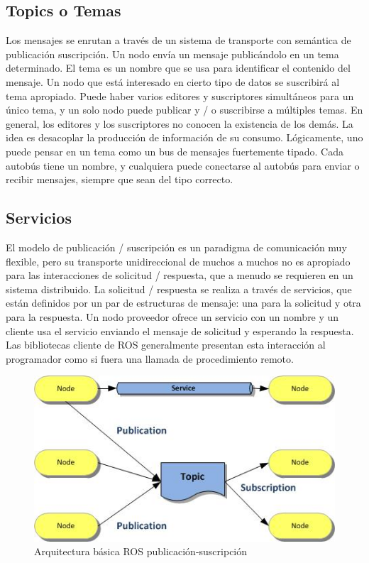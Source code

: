 \subsection{Topics o Temas}


Los mensajes se enrutan a través de un sistema de transporte con semántica de publicación suscripción. Un nodo envía un mensaje publicándolo en un tema determinado. El tema es un nombre que se usa para identificar el contenido del mensaje. Un nodo que está interesado en cierto tipo de datos se suscribirá al tema apropiado. Puede haber varios editores y suscriptores simultáneos para un único tema, y un solo nodo puede publicar y / o suscribirse a múltiples temas. En general, los editores y los suscriptores no conocen la existencia de los demás. La idea es desacoplar la producción de información de su consumo. Lógicamente, uno puede pensar en un tema como un bus de mensajes fuertemente tipado. Cada autobús tiene un nombre, y cualquiera puede conectarse al autobús para enviar o recibir mensajes, siempre que sean del tipo correcto.

\subsection{Servicios}
El modelo de publicación / suscripción es un paradigma de comunicación muy flexible, pero su transporte unidireccional de muchos a muchos no es apropiado para las interacciones de solicitud / respuesta, que a menudo se requieren en un sistema distribuido. La solicitud / respuesta se realiza a través de servicios, que están definidos por un par de estructuras de mensaje: una para la solicitud y otra para la respuesta. Un nodo proveedor ofrece un servicio con un nombre y un cliente usa el servicio enviando el mensaje de solicitud y esperando la respuesta. Las bibliotecas cliente de ROS generalmente presentan esta interacción al programador como si fuera una llamada de procedimiento remoto.

\begin{figure}[H]
    \centering
    \includegraphics[scale=1]{img/ros-architecture-3.jpg}
  	\caption{Arquitectura básica ROS publicación-suscripción}
  	\label{fig:ros-servicio}
\end{figure}
